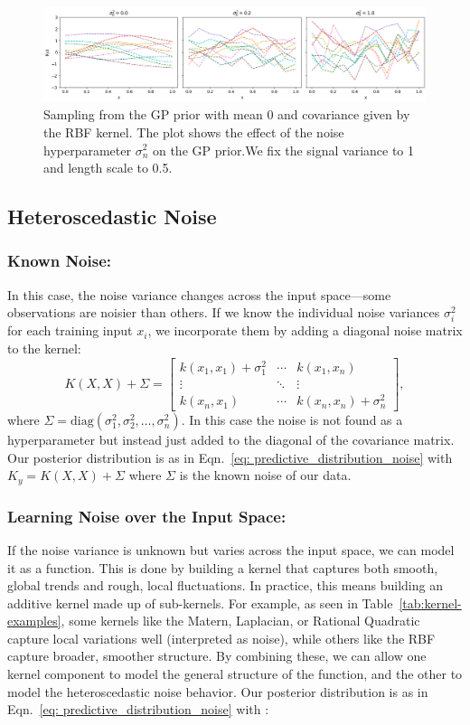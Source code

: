 \documentclass{ucdgradtaughtthesis}
\begin{document}
\begin{figure}[H]
    \centering
        \includegraphics[width=\textwidth]{LatexPlots/1dplots/Kernel_noise.png}
        \caption[Visualising the effect of noise on samples from the GP prior.]{Sampling from the GP prior with mean 0 and covariance given by the RBF kernel.
        The plot shows the effect of the noise hyperparameter \(\sigma_n^2\) on the GP prior.We fix the signal variance to 1 and length scale to 0.5.}
    \label{fig: kernel_noise}
\end{figure}



\subsection{Heteroscedastic Noise}  
\subsubsection{Known Noise:}
%
In this case, the noise variance changes across the input space—some observations are noisier than others. If we know the individual noise variances \( \sigma_i^2 \) for each training input \( x_i \), we incorporate them by adding a diagonal noise matrix to the kernel:
\[
K(X, X) + \Sigma = 
\begin{bmatrix}
k(x_1, x_1) + \sigma_1^2 & \cdots & k(x_1, x_n) \\
\vdots & \ddots & \vdots \\
k(x_n, x_1) & \cdots & k(x_n, x_n) + \sigma_n^2
\end{bmatrix},
\]
where \( \Sigma = \text{diag}(\sigma_1^2, \sigma_2^2, \dots, \sigma_n^2) \).
In this case the noise is not found as a hyperparameter but instead just added to the diagonal of the covariance matrix.
Our posterior distribution is as in Eqn.~\eqref{eq:  predictive_distribution_noise} with \(K_y =K(X, X) + \Sigma \) where \(\Sigma\) is the known noise of our data. 
%
\subsubsection{Learning Noise over the Input Space:}
%
If the noise variance is unknown but varies across the input space, we can model it as a function. 
This is done by building a kernel that captures both smooth, global trends and rough, local fluctuations. 
In practice, this means building an additive kernel made up of sub-kernels. For example, as seen in Table~\ref{tab:kernel-examples}, some kernels like the Matern, Laplacian, or Rational Quadratic capture local variations well (interpreted as noise),
while others like the RBF capture broader, smoother structure. By combining these, we can allow one kernel component to model the general structure of the function, and the other to model the heteroscedastic noise behavior. 
Our posterior distribution is as in Eqn.~\eqref{eq:  predictive_distribution_noise} with :
\end{document}
